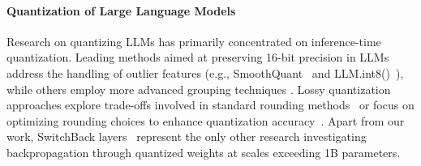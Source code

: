 \paragraph{Quantization of Large Language Models} Research on quantizing LLMs has primarily concentrated on inference-time quantization. Leading methods aimed at preserving 16-bit precision in LLMs address the handling of outlier features (e.g., SmoothQuant~\citep{xiao2022smoothquant} and LLM.int8()~\citep{dettmers2022llm}), while others employ more advanced grouping techniques \citep{park2022nuqmm, yao2022zeroquant}. Lossy quantization approaches explore trade-offs involved in standard rounding methods~\citep{dettmers2022case,zeng2022glm,pope2022efficiently} or focus on optimizing rounding choices to enhance quantization accuracy~\citep{frantar2022gptq}. Apart from our work, SwitchBack layers~\citep{wortsman2023stable} represent the only other research investigating backpropagation through quantized weights at scales exceeding 1B parameters.

